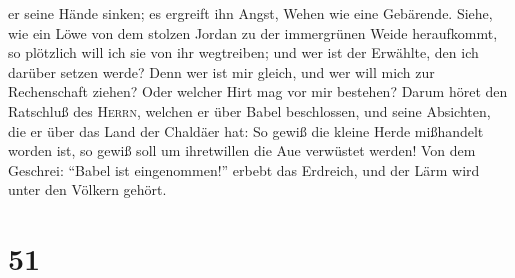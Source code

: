 er seine Hände sinken; es ergreift ihn Angst, Wehen wie eine Gebärende.
 Siehe, wie ein Löwe von dem stolzen Jordan zu der
immergrünen Weide heraufkommt, so plötzlich will ich sie von ihr
wegtreiben; und wer ist der Erwählte, den ich darüber setzen werde? Denn
wer ist mir gleich, und wer will mich zur Rechenschaft ziehen? Oder
welcher Hirt mag vor mir bestehen?  Darum höret den
Ratschluß des \textsc{Herrn}, welchen er über Babel beschlossen, und
seine Absichten, die er über das Land der Chaldäer hat: So gewiß die
kleine Herde mißhandelt worden ist, so gewiß soll um ihretwillen die Aue
verwüstet werden!  Von dem Geschrei: ``Babel ist
eingenommen!'' erbebt das Erdreich, und der Lärm wird unter den Völkern
gehört.

\hypertarget{section-50}{%
\section{51}\label{section-50}}


